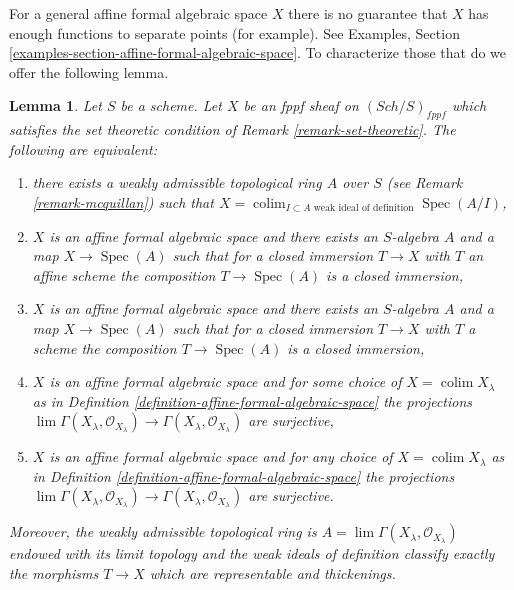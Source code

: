 \documentclass{stacks-project}
\theoremstyle{plain}
\newtheorem{lemma}[subsection]{Lemma}
\theoremstyle{definition}
\theoremstyle{remark}
\numberwithin{equation}{subsection}
\def\lim{\mathop{\mathrm{lim}}\nolimits}
\def\colim{\mathop{\mathrm{colim}}\nolimits}
\def\Spec{\mathop{\mathrm{Spec}}}
\def\Sch{\mathit{Sch}}
\begin{document}
\noindent
For a general affine formal algebraic space $X$ there is no guarantee
that $X$ has enough functions to separate points (for example).
See Examples, Section \ref{examples-section-affine-formal-algebraic-space}.
To characterize those that do we offer the following lemma.

\begin{lemma}
\label{lemma-mcquillan-affine-formal-algebraic-space}
Let $S$ be a scheme. Let $X$ be an fppf sheaf on $(\Sch/S)_{fppf}$
which satisfies the set theoretic condition of
Remark \ref{remark-set-theoretic}.
The following are equivalent:
\begin{enumerate}
\item there exists a weakly admissible topological ring $A$ over $S$
(see Remark \ref{remark-mcquillan}) such that
$X = \colim_{I \subset A\text{ weak ideal of definition}} \Spec(A/I)$,
\item $X$ is an affine formal algebraic space and
there exists an $S$-algebra $A$ and a map $X \to \Spec(A)$
such that for a closed immersion $T \to X$ with $T$ an affine scheme
the composition $T \to \Spec(A)$ is a closed immersion,
\item $X$ is an affine formal algebraic space and
there exists an $S$-algebra $A$ and a map $X \to \Spec(A)$
such that for a closed immersion $T \to X$ with $T$ a scheme
the composition $T \to \Spec(A)$ is a closed immersion,
\item $X$ is an affine formal algebraic space and
for some choice of $X = \colim X_\lambda$ as in
Definition \ref{definition-affine-formal-algebraic-space}
the projections $\lim \Gamma(X_\lambda, \mathcal{O}_{X_\lambda})
\to \Gamma(X_\lambda, \mathcal{O}_{X_\lambda})$ are surjective,
\item $X$ is an affine formal algebraic space and for any choice
of $X = \colim X_\lambda$ as in
Definition \ref{definition-affine-formal-algebraic-space}
the projections $\lim \Gamma(X_\lambda, \mathcal{O}_{X_\lambda})
\to \Gamma(X_\lambda, \mathcal{O}_{X_\lambda})$ are surjective.
\end{enumerate}
Moreover, the weakly admissible topological ring is
$A = \lim \Gamma(X_\lambda, \mathcal{O}_{X_\lambda})$
endowed with its limit topology and the weak ideals of definition
classify exactly the morphisms $T \to X$ which are representable
and thickenings.
\end{lemma}
\end{document}
